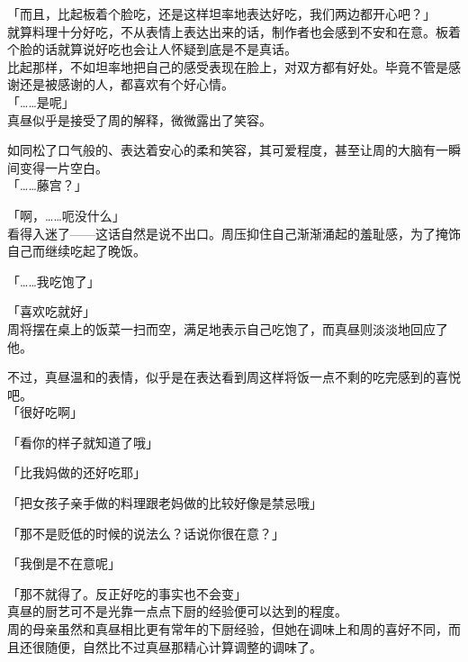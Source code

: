 「而且，比起板着个脸吃，还是这样坦率地表达好吃，我们两边都开心吧？」\\

就算料理十分好吃，不从表情上表达出来的话，制作者也会感到不安和在意。板着个脸的话就算说好吃也会让人怀疑到底是不是真话。\\

比起那样，不如坦率地把自己的感受表现在脸上，对双方都有好处。毕竟不管是感谢还是被感谢的人，都喜欢有个好心情。\\

「……是呢」\\

真昼似乎是接受了周的解释，微微露出了笑容。

如同松了口气般的、表达着安心的柔和笑容，其可爱程度，甚至让周的大脑有一瞬间变得一片空白。\\

「……藤宫？」

「啊，……呃没什么」\\

看得入迷了——这话自然是说不出口。周压抑住自己渐渐涌起的羞耻感，为了掩饰自己而继续吃起了晚饭。\\

\vspace{2\baselineskip}

「……我吃饱了」

「喜欢吃就好」\\

周将摆在桌上的饭菜一扫而空，满足地表示自己吃饱了，而真昼则淡淡地回应了他。

不过，真昼温和的表情，似乎是在表达看到周这样将饭一点不剩的吃完感到的喜悦吧。\\

「很好吃啊」

「看你的样子就知道了哦」

「比我妈做的还好吃耶」

「把女孩子亲手做的料理跟老妈做的比较好像是禁忌哦」

「那不是贬低的时候的说法么？话说你很在意？」

「我倒是不在意呢」

「那不就得了。反正好吃的事实也不会变」\\

真昼的厨艺可不是光靠一点点下厨的经验便可以达到的程度。\\

周的母亲虽然和真昼相比更有常年的下厨经验，但她在调味上和周的喜好不同，而且还很随便，自然比不过真昼那精心计算调整的调味了。\\

